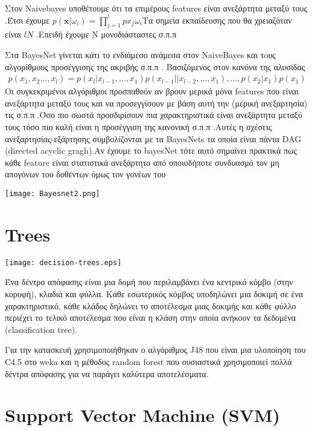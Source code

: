  Στον  Naivebayes υποθέτουμε ότι τα επιμέρους features είναι ανεξάρτητα μεταξύ τους .Έτσι έχουμε  $p(\mathbf{x}|\omega_i) = \prod_{j=1}^lp{x_j}{\omega_i} $Τα σημεία εκπαίδευσης που  θα χρειαζόταν 
 είναι  $lN$ .Επειδή έχουμε Ν μονοδιάσταστες σ.π.π  
 
Στα BayesΝet γίνεται κάτι το ενδιάμεσο ανάμεσα στον NaiveBayes και τoυς αλγορίθμους προσέγγισης της ακριβής σ.π.π . Βασιζόμενος στον κανόνα της αλυσίδας \\
\begin{align*}
p(x_1,x_2 \ldots ,x_l)  = p(x_l|x_{l-1},\ldots,x_1)p(x_{l-1}||x_{l-2},\ldots,x_1),\ldots,p(x_2|x_1)p(x_1)
\end{align*} 
Οι συγκεκριμένοι αλγόριθμοι προσπαθούν αν βρουν μερικά μόνα features που είναι ανεξάρτητα μεταξύ τους και να προσεγγίσουν με βάση αυτή την (μερική ανεξαρτησία) τις σ.π.π .Όσο πιο σωστά προσδιρίσουν πια χαρακτηριστικά είναι ανεξάρτητα μεταξύ τους τόσο πιο καλή είναι η προσέγγιση της κανονική σ.π.π .Αυτές η σχέσεις ανεξαρτησίας-εξάρτησης συμβολίζονται με τα BayesNets τα οποία είναι πάντα DAG (directed acyclic gragh).Αν έχουμε το bayesNet τότε αυτό σημαίνει πρακτικά πως κάθε feature  είναι στατιστικά ανεξάρτητο από οποιοδήποτε συνδυασμό τον μη απογόνων του δοθέντων όμως τον γονέων του 
\begin{center}
	\texttt{[image: Bayesnet2.png]}
	\label{fig:BayesNet}  
\end{center}

\section{Trees}
\begin{center}
    \texttt{[image: decision-trees.eps]}
    \label{fig:decision-tree}
\end{center}
Ένα δέντρο απόφασης είναι μια δομή που περιλαμβάνει ένα κεντρικό κόμβο (στην κορυφή), κλαδιά και φύλλα.
Κάθε εσωτερικός κόμβος υποδηλώνει μια δοκιμή σε ένα χαρακτηριστικό,
κάθε κλάδος δηλώνει το αποτέλεσμα μιας δοκιμής
και κάθε φύλλο περιέχει το τελικό αποτέλεσμα που είναι η κλάση στην οποία ανήκουν τα δεδομένα (classification tree).

Για την κατασκευή χρησιμοποιήθηκαν ο αλγόριθμος J48 που είναι μια υλοποίηση του C4.5 στο weka
και η μέθοδος random forest που ουσιαστικά χρησιμοποιεί πολλά δέντρα απόφασης για να παράγει καλύτερα αποτελέσματα.


\section{Support Vector Machine (SVM)}


